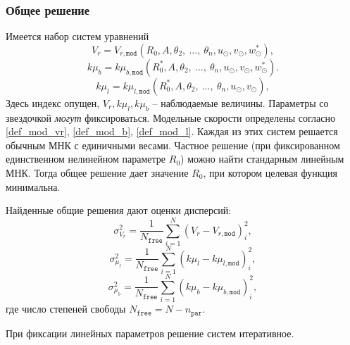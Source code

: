\documentclass{matmex-diploma-custom}
\begin{document}
\subsubsection{Общее решение}
Имеется набор систем уравнений
\begin{equation} \label{v_r_sys}
                V_r = V_{r, \texttt{mod}} (R_0, A, \theta_2, \:\ldots,\: \theta_n, u_{\odot}, v_{\odot}, w_{\odot}^{*}),
	\end{equation}
        \begin{equation} \label{b_sys}
                k\mu_b = k\mu_{b, \texttt{mod}} (R_0^{*}, A, \theta_2, \:\ldots,\: \theta_n, u_{\odot}, v_{\odot}, w_{\odot}^{*}).
	\end{equation}
        \begin{equation} \label{l_sys}
                k\mu_l = k\mu_{l, \texttt{mod}} (R_0^{*}, A, \theta_2, \:\ldots,\: \theta_n, u_{\odot}, v_{\odot}),
	\end{equation}
        Здесь индекс опущен, $V_r, k\mu_l, k\mu_b$ -- наблюдаемые величины. Параметры со звездочкой \textit{могут} фиксироваться. Модельные скорости определены согласно \ref{def_mod_vr}, \ref{def_mod_b}, \ref{def_mod_l}. Каждая из этих систем решается обычным МНК с единичными весами. Частное решение (при фиксированном единственном нелинейном параметре $R_0$) можно найти стандарным линейным МНК. Тогда общее решение дает значение $R_0$, при котором целевая функция минимальна. 
\par Найденные общие решения дают оценки дисперсий:
	\begin{equation}
                \sigma^2_{V_r} = \frac{1}{N_{\texttt{free}}} \sum^N_{i = 1} \left( V_r - V_{r, \texttt{mod}} \right)^2_i,
	\end{equation}
	\begin{equation}
                \sigma^2_{\mu_l} = \frac{1}{N_{\texttt{free}}} \sum^N_{i = 1} \left( k\mu_l - k\mu_{l, \texttt{mod}} \right)^2_i,
	\end{equation}
	\begin{equation}
                \sigma^2_{\mu_b} = \frac{1}{N_{\texttt{free}}} \sum^N_{i = 1} \left( k\mu_b - k\mu_{b, \texttt{mod}} \right)^2_i,
	\end{equation}
        где число степеней свободы $N_{\texttt{free}} = N - n_{\texttt{par}}$.

При фиксации линейных параметров решение систем итеративное. 
\end{document}
